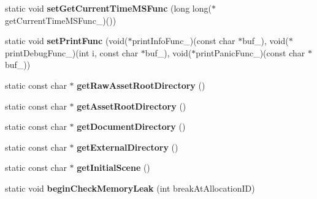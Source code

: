 \begin{DoxyCompactItemize}
\item 
static void {\bfseries set\+Get\+Current\+Time\+M\+S\+Func} (long long($\ast$get\+Current\+Time\+M\+S\+Func\+\_\+)())\hypertarget{class_i_dream_sky_1_1_stage_a8827f826496a436f812ae1d4a2a2f095}{}\label{class_i_dream_sky_1_1_stage_a8827f826496a436f812ae1d4a2a2f095}

\item 
static void {\bfseries set\+Print\+Func} (void($\ast$print\+Info\+Func\+\_\+)(const char $\ast$buf\+\_\+), void($\ast$print\+Debug\+Func\+\_\+)(int i, const char $\ast$buf\+\_\+), void($\ast$print\+Panic\+Func\+\_\+)(const char $\ast$buf\+\_\+))\hypertarget{class_i_dream_sky_1_1_stage_ae6113981459238cf0db751a375913f64}{}\label{class_i_dream_sky_1_1_stage_ae6113981459238cf0db751a375913f64}

\item 
static const char $\ast$ {\bfseries get\+Raw\+Asset\+Root\+Directory} ()\hypertarget{class_i_dream_sky_1_1_stage_a5fa64de9d586d661075f132d9cea1557}{}\label{class_i_dream_sky_1_1_stage_a5fa64de9d586d661075f132d9cea1557}

\item 
static const char $\ast$ {\bfseries get\+Asset\+Root\+Directory} ()\hypertarget{class_i_dream_sky_1_1_stage_ad90c074a274b57edb7ea3d886f4d8ccd}{}\label{class_i_dream_sky_1_1_stage_ad90c074a274b57edb7ea3d886f4d8ccd}

\item 
static const char $\ast$ {\bfseries get\+Document\+Directory} ()\hypertarget{class_i_dream_sky_1_1_stage_a9640dd3fa7a19c24d31edfd8da546f7b}{}\label{class_i_dream_sky_1_1_stage_a9640dd3fa7a19c24d31edfd8da546f7b}

\item 
static const char $\ast$ {\bfseries get\+External\+Directory} ()\hypertarget{class_i_dream_sky_1_1_stage_a06a68b51e7439cc58889bda0d1dc7f30}{}\label{class_i_dream_sky_1_1_stage_a06a68b51e7439cc58889bda0d1dc7f30}

\item 
static const char $\ast$ {\bfseries get\+Initial\+Scene} ()\hypertarget{class_i_dream_sky_1_1_stage_a42defb78012c0c77f558c7b91b7f0bb2}{}\label{class_i_dream_sky_1_1_stage_a42defb78012c0c77f558c7b91b7f0bb2}

\item 
static void {\bfseries begin\+Check\+Memory\+Leak} (int break\+At\+Allocation\+ID)\hypertarget{class_i_dream_sky_1_1_stage_abed51265b3514779f147ee198bb40aa1}{}\label{class_i_dream_sky_1_1_stage_abed51265b3514779f147ee198bb40aa1}


\end{DoxyCompactItemize}
